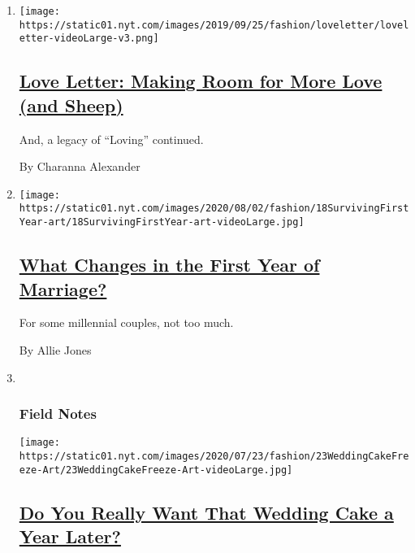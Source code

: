 \begin{enumerate}
\def\labelenumi{\arabic{enumi}.}
\item
  \texttt{[image: https://static01.nyt.com/images/2019/09/25/fashion/loveletter/loveletter-videoLarge-v3.png]}

  \hypertarget{love-letter-making-room-for-more-love-and-sheep}{%
  \subsection{\texorpdfstring{\href{/2020/07/31/fashion/weddings/love-letter-newsletter-making-room-for-more-love-and-sheep.html}{Love
  Letter: Making Room for More Love (and
  Sheep)}}{Love Letter: Making Room for More Love (and Sheep)}}\label{love-letter-making-room-for-more-love-and-sheep}}

  And, a legacy of ``Loving'' continued.

  By Charanna Alexander
\item
  \texttt{[image: https://static01.nyt.com/images/2020/08/02/fashion/18SurvivingFirstYear-art/18SurvivingFirstYear-art-videoLarge.jpg]}

  \hypertarget{what-changes-in-the-first-year-of-marriage}{%
  \subsection{\texorpdfstring{\href{/2020/07/23/fashion/weddings/what-changes-in-the-first-year-of-marriage.html}{What
  Changes in the First Year of
  Marriage?}}{What Changes in the First Year of Marriage?}}\label{what-changes-in-the-first-year-of-marriage}}

  For some millennial couples, not too much.

  By Allie Jones
\item ~
  \hypertarget{field-notes-1}{%
  \subsubsection{Field Notes}\label{field-notes-1}}

  \texttt{[image: https://static01.nyt.com/images/2020/07/23/fashion/23WeddingCakeFreeze-Art/23WeddingCakeFreeze-Art-videoLarge.jpg]}

  \hypertarget{do-you-really-want-that-wedding-cake-a-year-later}{%
  \subsection{\texorpdfstring{\href{/2020/07/22/fashion/weddings/do-you-really-want-that-wedding-cake-a-year-later.html}{Do
  You Really Want That Wedding Cake a Year
  Later?}}{Do You Really Want That Wedding Cake a Year Later?}}\label{do-you-really-want-that-wedding-cake-a-year-later}}


\end{enumerate}

